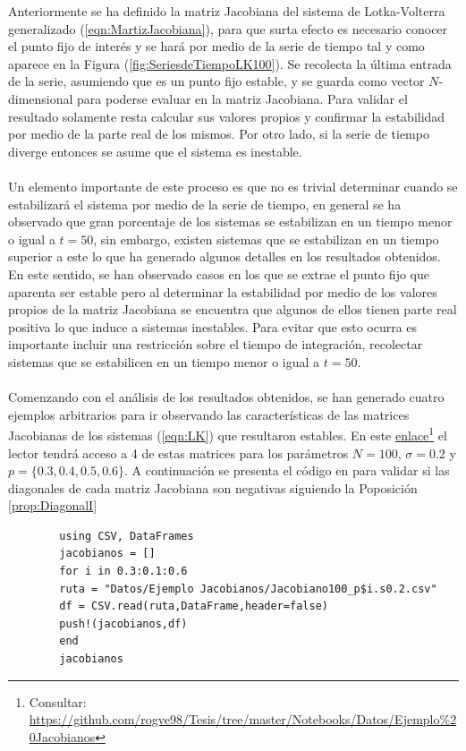 Anteriormente se ha definido la matriz Jacobiana del sistema de Lotka-Volterra generalizado (\ref{eqn:MartizJacobiana}), para que surta efecto es necesario conocer el punto fijo de interés y se hará por medio de la serie de tiempo tal y como aparece en la Figura (\ref{fig:SeriesdeTiempoLK100}). Se recolecta la última entrada de la serie, asumiendo que es un punto fijo estable, y se guarda como vector $N$-dimensional para poderse evaluar en la matriz Jacobiana. Para validar el resultado solamente resta calcular sus valores propios y confirmar la estabilidad por medio de la parte real de los mismos. Por otro lado, si la serie de tiempo diverge entonces se asume que el sistema es inestable.
\\
\\
Un elemento importante de este proceso es que no es trivial determinar cuando se estabilizará el sistema por medio de la serie de tiempo, en general se ha observado que gran porcentaje de los sistemas se estabilizan en un tiempo menor o igual a $t=50$, sin embargo, existen sistemas que se estabilizan en un tiempo superior a este lo que ha generado algunos detalles en los resultados obtenidos. En este sentido, se han observado casos en los que se extrae el punto fijo que aparenta ser estable pero al determinar la estabilidad por medio de los valores propios de la matriz Jacobiana se encuentra que  algunos de ellos tienen parte real positiva lo que induce a sistemas inestables. Para evitar que esto ocurra es importante incluir una restricción sobre el tiempo de integración, recolectar sistemas que se estabilicen en un tiempo menor o igual a $t=50$.
\\
\\
Comenzando con el análisis de los resultados obtenidos, se han generado cuatro ejemplos arbitrarios para ir observando las características de las matrices Jacobianas de los sistemas (\ref{eqn:LK}) que resultaron estables. En este \href{https://github.com/rogve98/Tesis/tree/master/Notebooks/Datos/Ejemplo\%20Jacobianos}{enlace}\footnote{Consultar: \url{https://github.com/rogve98/Tesis/tree/master/Notebooks/Datos/Ejemplo\%20Jacobianos}} el lector tendrá acceso a 4 de estas matrices para los parámetros $N=100$, $\sigma=0.2$ y $p=\{0.3,0.4,0.5,0.6\}$. A continuación se presenta el código en \julia para validar si las diagonales de cada matriz Jacobiana son negativas siguiendo la Poposición \ref{prop:DiagonalI}
\begin{tcolorbox}[colback=green!10!white, colframe=black, title=Entrada]
	\begin{verbatim}
		using CSV, DataFrames
		jacobianos = []
		for i in 0.3:0.1:0.6
		ruta = "Datos/Ejemplo Jacobianos/Jacobiano100_p$i.s0.2.csv"
		df = CSV.read(ruta,DataFrame,header=false)
		push!(jacobianos,df)
		end
		jacobianos
	\end{verbatim}
\end{tcolorbox}

